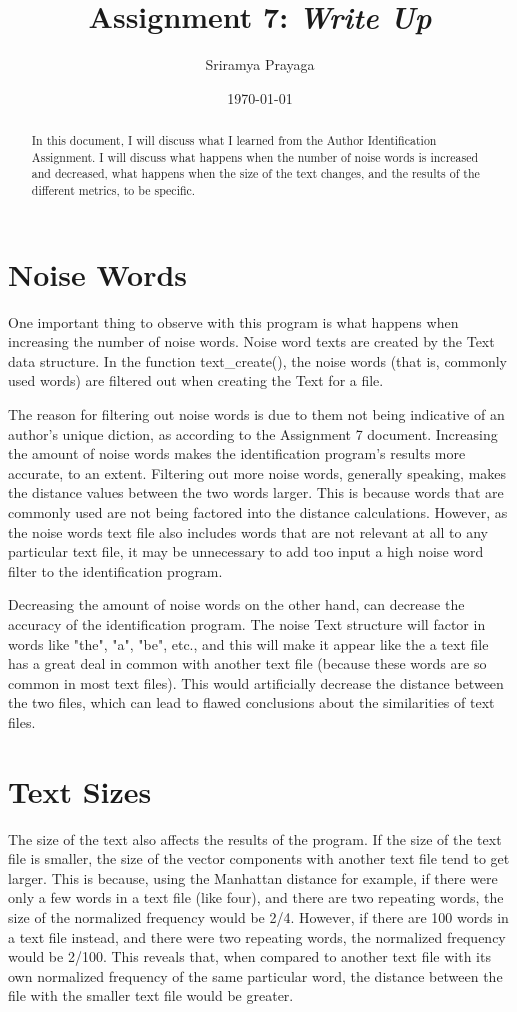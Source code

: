 \documentclass[11pt]{article}
\title{Assignment 7: \emph{Write Up}}
\author{Sriramya Prayaga}
\date{\today}
\begin{document}
 \maketitle

\begin{abstract}
\begin{center}
In this document, I will discuss what I learned from the Author Identification Assignment. I will discuss what happens when the number of noise words is increased and decreased, what happens when the size of the text changes, and the results of the different metrics, to be specific.
\end{center}
\end{abstract}
\section{Noise Words}
One important thing to observe with this program is what happens when increasing the number of noise words. Noise word texts are created by the Text data structure. In the function text\_create(), the noise words (that is, commonly used words) are filtered out when creating the Text for a file.

The reason for filtering out noise words is due to them not being indicative of an author's unique diction, as according to the Assignment 7 document. Increasing the amount of noise words makes the identification program's results more accurate, to an extent. Filtering out more noise words, generally speaking, makes the distance values between the two words larger. This is because words that are commonly used are not being factored into the distance calculations. However, as the noise words text file also includes words that are not relevant at all to any particular text file, it may be unnecessary to add too input a high noise word filter to the identification program.

Decreasing the amount of noise words on the other hand, can decrease the accuracy of the identification program. The noise Text structure will factor in words like "the", "a", "be", etc., and this will make it appear like the a text file has a  great deal in common with another text file (because these words are so common in most text files). This would artificially decrease the distance between the two files, which can lead to flawed conclusions about the similarities of text files.
\section{Text Sizes}
The size of the text also affects the results of the program. If the size of the text file is smaller, the size of the vector components with another text file tend to get larger. This is because, using the Manhattan distance for example, if there were only a few words in a text file (like four), and there are two repeating words, the size of the normalized frequency would be 2/4. However, if there are 100 words in a text file instead, and there were two repeating words, the normalized frequency would be 2/100. This reveals that, when compared to another text file with its own normalized frequency of the same particular word, the distance between the file with the smaller text file would be greater.
\end{document}
